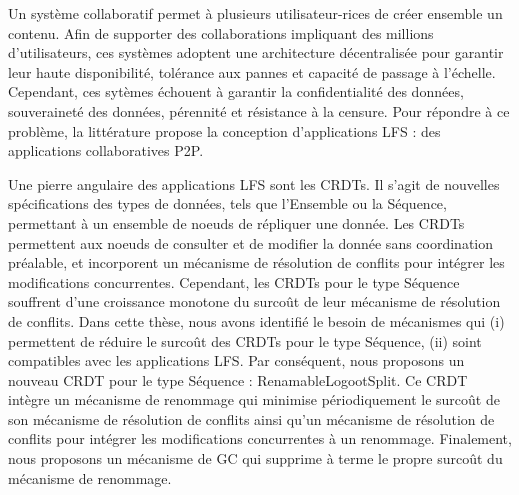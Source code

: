 \begin{ThesisAbstract}
    \vspace{-3cm}
    \begin{FrenchAbstract}
        Un système collaboratif permet à plusieurs utilisateur-rices de créer ensemble un contenu.
        Afin de supporter des collaborations impliquant des millions d'utilisateurs, ces systèmes adoptent une architecture décentralisée pour garantir leur haute disponibilité, tolérance aux pannes et capacité de passage à l'échelle.
        Cependant, ces sytèmes échouent à garantir la confidentialité des données, souveraineté des données, pérennité et résistance à la censure.
        Pour répondre à ce problème, la littérature propose la conception d'applications \acf{LFS} : des applications collaboratives \acf{P2P}.

        Une pierre angulaire des applications \ac{LFS} sont les \acfp{CRDT}.
        Il s'agit de nouvelles spécifications des types de données, tels que l'Ensemble ou la Séquence, permettant à un ensemble de noeuds de répliquer une donnée.
        Les \acp{CRDT} permettent aux noeuds de consulter et de modifier la donnée sans coordination préalable, et incorporent un mécanisme de résolution de conflits pour intégrer les modifications concurrentes.
        Cependant, les \acp{CRDT} pour le type Séquence souffrent d'une croissance monotone du surcoût de leur mécanisme de résolution de conflits.
        Dans cette thèse, nous avons identifié le besoin de mécanismes qui (i) permettent de réduire le surcoût des \acp{CRDT} pour le type Séquence, (ii) soint compatibles avec les applications \ac{LFS}.
        Par conséquent, nous proposons un nouveau \ac{CRDT} pour le type Séquence : RenamableLogootSplit.
        Ce \ac{CRDT} intègre un mécanisme de renommage qui minimise périodiquement le surcoût de son mécanisme de résolution de conflits ainsi qu'un mécanisme de résolution de conflits pour intégrer les modifications concurrentes à un renommage.
        Finalement, nous proposons un mécanisme de \acf{GC} qui supprime à terme le propre surcoût du mécanisme de renommage.


\end{FrenchAbstract}
\end{ThesisAbstract}
